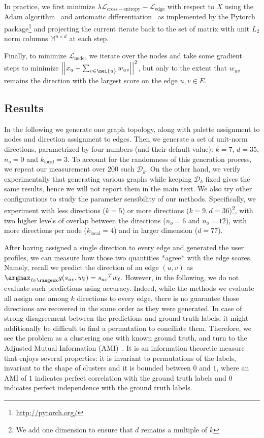 In practice, we first minimize $\lambda \mathcal{L}_{\mathrm{cross-entropy}} -
\mathcal{L}_{\mathrm{edge}}$ with respect to $X$ using the Adam algorithm~\autocite{Adam15} and
automatic differentiation~\autocite{autograd15} as implemented by the Pytorch
package\footnote{\url{http://pytorch.org/}} and projecting the current iterate back to the set of
matrix with unit $L_2$ norm columns $\mathbb{M}^{n\times d}$ at each step.

Finally, to minimize $\mathcal{L}_{\mathrm{node}}$, we iterate over the nodes and take some gradient
steps to minimize $\left|\left| x_u - \sum_{v\in\nei{u}} w_{uv}\right|\right|^2$, but only to the
extent that $w_{uv}$ remains the direction with the largest score on the edge $u,v \in E$.

\subsection{Results}
\label{sub:edge_synth_results}

In the following we generate one graph topology, along with palette assignment to nodes and
direction assignment to edges. Then we generate a set of unit-norm directions,
parametrized by four numbers (and their default value): $k=7$, $d=35$, $n_o=0$ and
$k_{\mathrm{local}}=3$. To account for the randomness of this generation process, we repeat our
measurement over 200 such $\mathcal{D}_k$. On the other hand, we verify experimentally that
generating various graphs while keeping $\mathcal{D}_k$ fixed gives the same results, hence we will
not report them in the main text.
We also try other configurations to study the parameter sensibility of our methods. Specifically, we
experiment with less directions ($k=5$) or more directions ($k=9, d=36$)\footnote{We add one
dimension to ensure that $d$ remains a multiple of $k$}, with two higher levels of overlap between
the directions ($n_o=6$ and $n_o=12$), with more directions per node ($k_{\mathrm{local}}=4$) and in
larger dimension ($d=77$).

After having assigned a single direction to every edge and generated the user profiles, we can
measure how those two quantities *agree* with the edge scores. Namely, recall we predict the
direction of an edge $(u,v)$ as $\argmax_{\ell \in \rangesk} g(s_{uv}, w_\ell) = {s_{uv}}^T w_\ell$.
However, in the following, we do not evaluate such predictions using accuracy. Indeed, while the
methods we evaluate all assign one among $k$ directions to every edge, there is no guarantee those
directions are recovered in the same order as they were generated. In case of strong disagreement
between the predictions and ground truth labels, it might additionally be difficult to find a
permutation to conciliate them.  Therefore, we see the problem as a clustering one with known ground
truth, and turn to the Adjusted Mutual Information (AMI)~\autocite{AMI09}. It is an information
theoretic measure that enjoys several properties: it is invariant to permutations of the labels,
invariant to the shape of clusters and it is bounded between $0$ and $1$, where an AMI of $1$
indicates perfect correlation with the ground truth labels and $0$ indicates perfect independence
with the ground truth labels.

